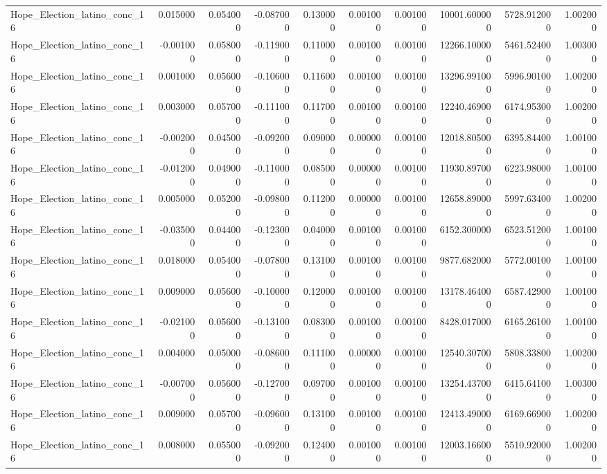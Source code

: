 \begin{table}
\begin{tabular}{lrrrrrrrrr}
Hope_Election_latino_conc_16 & 0.015000 & 0.054000 & -0.087000 & 0.130000 & 0.001000 & 0.001000 & 10001.600000 & 5728.912000 & 1.002000 \\
Hope_Election_latino_conc_16 & -0.001000 & 0.058000 & -0.119000 & 0.110000 & 0.001000 & 0.001000 & 12266.100000 & 5461.524000 & 1.003000 \\
Hope_Election_latino_conc_16 & 0.001000 & 0.056000 & -0.106000 & 0.116000 & 0.001000 & 0.001000 & 13296.991000 & 5996.901000 & 1.002000 \\
Hope_Election_latino_conc_16 & 0.003000 & 0.057000 & -0.111000 & 0.117000 & 0.001000 & 0.001000 & 12240.469000 & 6174.953000 & 1.002000 \\
Hope_Election_latino_conc_16 & -0.002000 & 0.045000 & -0.092000 & 0.090000 & 0.000000 & 0.001000 & 12018.805000 & 6395.844000 & 1.001000 \\
Hope_Election_latino_conc_16 & -0.012000 & 0.049000 & -0.110000 & 0.085000 & 0.000000 & 0.001000 & 11930.897000 & 6223.980000 & 1.001000 \\
Hope_Election_latino_conc_16 & 0.005000 & 0.052000 & -0.098000 & 0.112000 & 0.000000 & 0.001000 & 12658.890000 & 5997.634000 & 1.002000 \\
Hope_Election_latino_conc_16 & -0.035000 & 0.044000 & -0.123000 & 0.040000 & 0.001000 & 0.001000 & 6152.300000 & 6523.512000 & 1.001000 \\
Hope_Election_latino_conc_16 & 0.018000 & 0.054000 & -0.078000 & 0.131000 & 0.001000 & 0.001000 & 9877.682000 & 5772.001000 & 1.001000 \\
Hope_Election_latino_conc_16 & 0.009000 & 0.056000 & -0.100000 & 0.120000 & 0.001000 & 0.001000 & 13178.464000 & 6587.429000 & 1.001000 \\
Hope_Election_latino_conc_16 & -0.021000 & 0.056000 & -0.131000 & 0.083000 & 0.001000 & 0.001000 & 8428.017000 & 6165.261000 & 1.001000 \\
Hope_Election_latino_conc_16 & 0.004000 & 0.050000 & -0.086000 & 0.111000 & 0.000000 & 0.001000 & 12540.307000 & 5808.338000 & 1.002000 \\
Hope_Election_latino_conc_16 & -0.007000 & 0.056000 & -0.127000 & 0.097000 & 0.001000 & 0.001000 & 13254.437000 & 6415.641000 & 1.003000 \\
Hope_Election_latino_conc_16 & 0.009000 & 0.057000 & -0.096000 & 0.131000 & 0.001000 & 0.001000 & 12413.490000 & 6169.669000 & 1.002000 \\
Hope_Election_latino_conc_16 & 0.008000 & 0.055000 & -0.092000 & 0.124000 & 0.001000 & 0.001000 & 12003.166000 & 5510.920000 & 1.002000 \\

\end{tabular}
\end{table}
